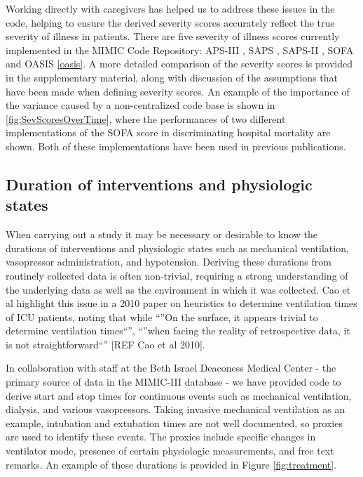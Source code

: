 \documentclass{elsart}
\begin{document}
Working directly with caregivers has helped us to address these issues in the code, helping to ensure the derived severity scores accurately reflect the true severity of illness in patients. There are five severity of illness scores currently implemented in the MIMIC Code Repository: APS-III \cite{aps}, SAPS \cite{saps}, SAPS-II \cite{sapsii}, SOFA \cite{sofa} and OASIS \ref{oasis}. A more detailed comparison of the severity scores is provided in the supplementary material, along with discussion of the assumptions that have been made when defining severity scores. An example of the importance of the variance caused by a non-centralized code base is shown in \ref{fig:SevScoresOverTime}, where the performances of two different implementations of the SOFA score in discriminating hospital mortality are shown. Both of these implementations have been used in previous publications.

\subsection{Duration of interventions and physiologic states}



When carrying out a study it may be necessary or desirable to know the durations of interventions and physiologic states such as mechanical ventilation, vasopressor administration, and hypotension. Deriving these durations from routinely collected data is often non-trivial, requiring a strong understanding of the underlying data as well as the environment in which it was collected. Cao et al highlight this issue in a 2010 paper on heuristics to determine ventilation times of ICU patients, noting that while ``''On the surface, it appears trivial to determine ventilation times``'', ``''when facing the reality of retrospective data, it is not straightforward``'' [REF Cao et al 2010].

In collaboration with staff at the Beth Israel Deaconess Medical Center - the primary source of data in the MIMIC-III database - we have provided code to derive start and stop times for continuous events such as mechanical ventilation, dialysis, and various vasopressors. Taking invasive mechanical ventilation as an example, intubation and extubation times are not well documented, so proxies are used to identify these events. The proxies include specific changes in ventilator mode, presence of certain physiologic measurements, and free text remarks. An example of these durations is provided in Figure \ref{fig:treatment}.
\end{document}
